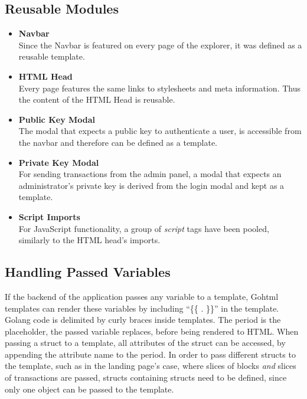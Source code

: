 \subsection{Reusable Modules}
\begin{itemize}
\item \textbf{Navbar}\\
Since the Navbar is featured on every page of the explorer, it was defined as a reusable template.
\item \textbf{HTML Head}\\
Every page features the same links to stylesheets and meta information. Thus the content of the HTML Head is reusable.
\item \textbf{Public Key Modal}\\
The modal that expects a public key to authenticate a user, is accessible from the navbar and therefore can be defined as a template.
\item \textbf{Private Key Modal}\\
For sending transactions from the admin panel, a modal that expects an administrator's private key is derived from the login modal and kept as a template.
\item \textbf{Script Imports}\\
For JavaScript functionality, a group of \emph{script} tags have been pooled, similarly to the HTML head's imports.
\end{itemize}

\subsection{Handling Passed Variables}
If the backend of the application passes any variable to a template, Gohtml templates can render these variables by including ``\{\{ . \}\}'' in the template. Golang code is delimited by curly braces inside templates. The period is the placeholder, the passed variable replaces, before being rendered to HTML. When passing a struct to a template, all attributes of the struct can be accessed, by appending the attribute name to the period. In order to pass different structs to the template, such as in the landing page's case, where slices of blocks \emph{and} slices of transactions are passed, structs containing structs need to be defined, since only one object can be passed to the template. 

